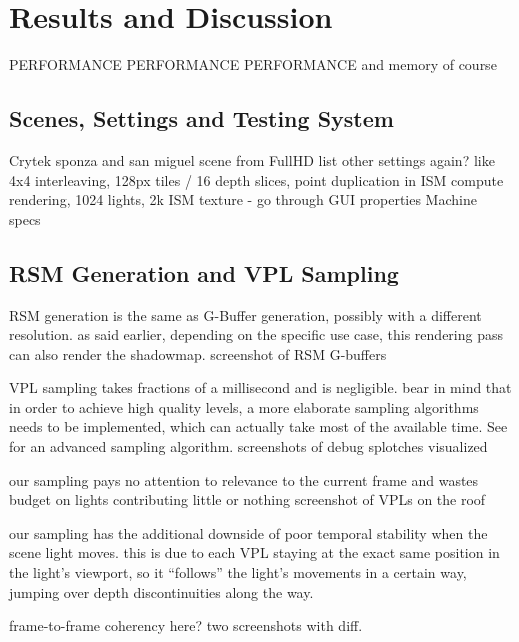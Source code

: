 

\chapter{Results and Discussion}

PERFORMANCE PERFORMANCE PERFORMANCE
and memory of course
\section{Scenes, Settings and Testing System}
\begin{outline}
\1 Crytek sponza and san miguel scene from \citep{McGuire2011Data}
\1 FullHD
\1 list other settings again? like 4x4 interleaving, 128px tiles / 16 depth slices, point duplication in ISM compute rendering, 1024 lights, 2k ISM texture
    - go through GUI properties
\1 Machine specs
\end{outline}

\section{RSM Generation and VPL Sampling}
\begin{outline}
\1 RSM generation is the same as G-Buffer generation, possibly with a different resolution. as said earlier, depending on the specific use case, this rendering pass can also render the shadowmap.
\1 screenshot of RSM G-buffers

\1 VPL sampling takes fractions of a millisecond and is negligible. bear in mind that in order to achieve high quality levels, a more elaborate sampling algorithms needs to be implemented, which can actually take most of the available time. See \citep{hedman2016sequential} for an advanced sampling algorithm.
\1 screenshots of debug splotches visualized

\1 our sampling pays no attention to relevance to the current frame and wastes budget on lights contributing little or nothing
\1 screenshot of VPLs on the roof

\1 our sampling has the additional downside of poor temporal stability when the scene light moves. this is due to each VPL staying at the exact same position in the light's viewport, so it ``follows'' the light's movements in a certain way, jumping over depth discontinuities along the way.

\1 frame-to-frame coherency here? two screenshots with diff.
\end{outline}


